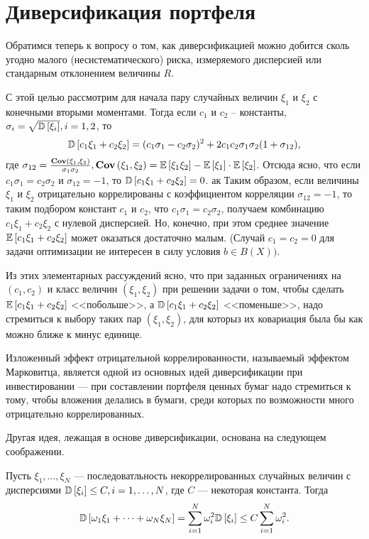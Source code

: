 \section{Диверсификация портфеля}

Обратимся теперь к вопросу о том, как диверсификацией можно добится сколь угодно малого (несистематического) риска, измеряемого дисперсией
или стандарным отклонением величины $R$.

С этой целью рассмотрим для начала пару случайных величин $\xi_1$ и $\xi_2$ с конечными вторыми моментами. Тогда если $c_1$ и $c_2$ -- константы,
$\sigma_i = \sqrt{\mathbb{D}\left[\xi_i\right]}, i=1,2$, то 
\begin{align}
\mathbb{D}\left[c_1 \xi_1 + c_2 \xi_2\right] = 
	(c_1 \sigma_1 - c_2 \sigma_2)^2 + 2 c_1 c_2 \sigma_1 \sigma_2 (1 + \sigma_{12}),
\end{align}
где $\sigma_{12} = \frac{\textbf{Cov}\left(\xi_1, \xi_2\right)}{\sigma_1 \sigma_2}, \textbf{Cov}\left(\xi_1, \xi_2\right) = \mathbb{E}\left[\xi_1 \xi_2\right] - \mathbb{E}\left[\xi_1\right] \cdot \mathbb{E}\left[\xi_2\right]$.
Отсюда ясно, что если $c_1 \sigma_1 = c_2 \sigma_2$ и $\sigma_{12} = -1$, то $\mathbb{D}\left[c_1 \xi_1 + c_2 \xi_2\right] = 0$.
ак
Таким образом, если величины $\xi_1$ и $\xi_2$ отрицательно коррелированы с коэффициентом корреляции $\sigma_{12} = -1$, то таким подбором
констант $c_1$ и $c_2$, что $c_1 \sigma_1 = c_2 \sigma_2$, получаем комбинацию $c_1 \xi_1 + c_2 \xi_2$ с нулевой дисперсией. Но,
конечно, при этом среднее значение $\mathbb{E}\left[c_1 \xi_1 + c_2 \xi_2\right]$ может оказаться достаточно малым. (Случай $c_1 = c_2 = 0$ для задачи 
оптимизации не интересен в силу условия $b \in B(X))$.

Из этих элементарных рассуждений ясно, что при заданных ограничениях на $(c_1, c_2)$ и класс величин $(\xi_1, \xi_2)$ при решении задачи о том,
чтобы сделать $\mathbb{E}\left[c_1 \xi_1 + c_2 \xi_2\right]$ <<побольше>>, а $\mathbb{D}\left[c_1 \xi_1 + c_2 \xi_2\right]$ <<поменьше>>, надо стремиться к выбору таких пар 
$(\xi_1, \xi_2)$, для которыз их ковариация была бы как можно ближе к минус единице.

Изложенный эффект отрицательной коррелированности, называемый эффектом Марковитца, является одной из основных идей диверсификации при инвестировании ---
при составлении портфеля ценных бумаг надо стремиться к тому, чтобы вложения делались в бумаги, среди которых по возможности много отрицательно коррелированных.

Другая идея, лежащая в основе диверсификации, основана на следующем соображении.

Пусть $\xi_1, \dots, \xi_N$ --- последоватльность некоррелированных случайных величин с дисперсиями $\mathbb{D}\left[\xi_i\right] \le C, i=1, \dots, N$, 
где $C$ --- некоторая константа. Тогда
\begin{align}
\mathbb{D}\left[\omega_1 \xi_1 + \dots + \omega_N \xi_N\right] = \sum_{i=1}^{N} \omega_i^2 \mathbb{D}\left[\xi_i\right] \le C \sum_{i=1}^{N} \omega_i^2 .
\end{align}

